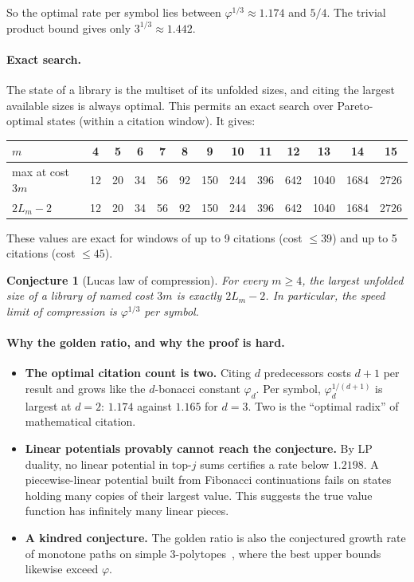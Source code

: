 \documentclass[11pt]{article}
\newtheorem{conjecture}{Conjecture}
\theoremstyle{remark}
\begin{document}
\noindent So the optimal rate per symbol lies between $\varphi^{1/3}\approx1.174$ and
$5/4$. The trivial product bound gives only $3^{1/3}\approx1.442$.

\paragraph{Exact search.} The state of a library is the multiset of its unfolded sizes,
and citing the largest available sizes is always optimal. This permits an exact search
over Pareto-optimal states (within a citation window). It gives:
\begin{center}\small
\begin{tabular}{lcccccccccccc}
\toprule
$m$ & 4&5&6&7&8&9&10&11&12&13&14&15\\
\midrule
max at cost $3m$ & 12&20&34&56&92&150&244&396&642&1040&1684&2726\\
$2L_m-2$ & 12&20&34&56&92&150&244&396&642&1040&1684&2726\\
\bottomrule
\end{tabular}
\end{center}
These values are exact for windows of up to 9 citations (cost $\le39$) and up to 5
citations (cost $\le45$).

\begin{conjecture}[Lucas law of compression]\label{conj:lucas}
For every $m\ge4$, the largest unfolded size of a library of named cost $3m$ is exactly
$2L_m-2$. In particular, the speed limit of compression is $\varphi^{1/3}$ per symbol.
\end{conjecture}

\paragraph{Why the golden ratio, and why the proof is hard.}
\begin{itemize}
\item \textbf{The optimal citation count is two.} Citing $d$ predecessors costs $d+1$ per
  result and grows like the $d$-bonacci constant $\varphi_d$. Per symbol,
  $\varphi_d^{1/(d+1)}$ is largest at $d=2$: $1.174$ against $1.165$ for $d=3$. Two is
  the ``optimal radix'' of mathematical citation.
\item \textbf{Linear potentials provably cannot reach the conjecture.} By LP duality, no
  linear potential in top-$j$ sums certifies a rate below $1.2198$. A piecewise-linear
  potential built from Fibonacci continuations fails on states holding many copies of
  their largest value. This suggests the true value function has infinitely many linear
  pieces.
\item \textbf{A kindred conjecture.} The golden ratio is also the conjectured growth rate
  of monotone paths on simple 3-polytopes~\cite{adz}, where the best upper bounds likewise
  exceed $\varphi$.
\end{itemize}
\end{document}
